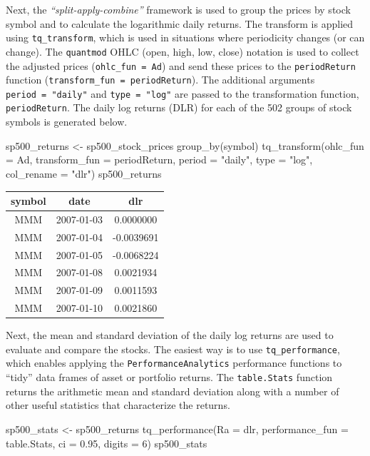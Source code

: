 Next, the \emph{``split-apply-combine''} framework is used to group the
prices by stock symbol and to calculate the logarithmic daily returns.
The transform is applied using \texttt{tq\_transform}, which is used in
situations where periodicity changes (or can change). The
\texttt{quantmod} OHLC (open, high, low, close) notation is used to
collect the adjusted prices (\texttt{ohlc\_fun\ =\ Ad}) and send these
prices to the \texttt{periodReturn} function
(\texttt{transform\_fun\ =\ periodReturn}). The additional arguments
\texttt{period\ =\ "daily"} and \texttt{type\ =\ "log"} are passed to
the transformation function, \texttt{periodReturn}. The daily log
returns (DLR) for each of the 502 groups of stock symbols is generated
below.

\begin{Schunk}
\begin{Sinput}
sp500_returns <- sp500_stock_prices %
    group_by(symbol) %
    tq_transform(ohlc_fun = Ad, transform_fun = periodReturn, 
                 period = "daily", type = "log", col_rename = "dlr")
sp500_returns
\end{Sinput}
\end{Schunk}

\begin{tabular}{ccc}
\toprule
symbol & date & dlr\\
\midrule
MMM & 2007-01-03 & 0.0000000\\
MMM & 2007-01-04 & -0.0039691\\
MMM & 2007-01-05 & -0.0068224\\
MMM & 2007-01-08 & 0.0021934\\
MMM & 2007-01-09 & 0.0011593\\
MMM & 2007-01-10 & 0.0021860\\
\bottomrule
\end{tabular}

\hspace{20 mm}

Next, the mean and standard deviation of the daily log returns are used
to evaluate and compare the stocks. The easiest way is to use
\texttt{tq\_performance}, which enables applying the
\texttt{PerformanceAnalytics} performance functions to ``tidy'' data
frames of asset or portfolio returns. The \texttt{table.Stats} function
returns the arithmetic mean and standard deviation along with a number
of other useful statistics that characterize the returns.

\begin{Schunk}
\begin{Sinput}
sp500_stats <- sp500_returns %
    tq_performance(Ra = dlr, performance_fun = table.Stats, ci = 0.95, digits = 6) 
sp500_stats
\end{Sinput}
\end{Schunk}

